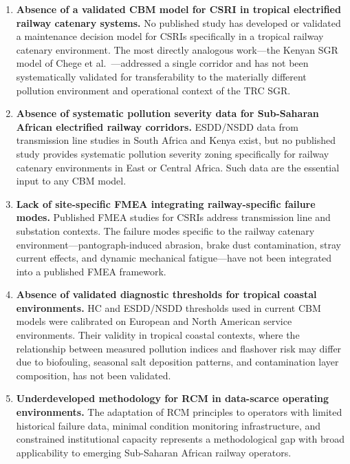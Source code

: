 \documentclass[preprint,12pt,3p]{elsarticle}
\begin{document}
\begin{enumerate}

  \item \textbf{Absence of a validated CBM model for CSRI in tropical
    electrified railway catenary systems.} No published study has
    developed or validated a maintenance decision model for CSRIs
    specifically in a tropical railway catenary environment. The most
    directly analogous work---the Kenyan SGR model of Chege et al.\
    \cite{Chege2019}---addressed a single corridor and has not been
    systematically validated for transferability to the materially
    different pollution environment and operational context of the
    TRC SGR.

  \item \textbf{Absence of systematic pollution severity data for
    Sub-Saharan African electrified railway corridors.} ESDD/NSDD
    data from transmission line studies in South Africa and Kenya
    exist, but no published study provides systematic pollution
    severity zoning specifically for railway catenary environments in
    East or Central Africa. Such data are the essential input to
    any CBM model.

  \item \textbf{Lack of site-specific FMEA integrating railway-specific
    failure modes.} Published FMEA studies for CSRIs address
    transmission line and substation contexts. The failure modes
    specific to the railway catenary environment---pantograph-induced
    abrasion, brake dust contamination, stray current effects, and
    dynamic mechanical fatigue---have not been integrated into a
    published FMEA framework.

  \item \textbf{Absence of validated diagnostic thresholds for
    tropical coastal environments.} HC and ESDD/NSDD thresholds used
    in current CBM models were calibrated on European and North American
    service environments. Their validity in tropical coastal contexts,
    where the relationship between measured pollution indices and
    flashover risk may differ due to biofouling, seasonal salt
    deposition patterns, and contamination layer composition, has
    not been validated.

  \item \textbf{Underdeveloped methodology for RCM in data-scarce
    operating environments.} The adaptation of RCM principles to
    operators with limited historical failure data, minimal condition
    monitoring infrastructure, and constrained institutional capacity
    represents a methodological gap with broad applicability to emerging
    Sub-Saharan African railway operators.

\end{enumerate}
\end{document}
